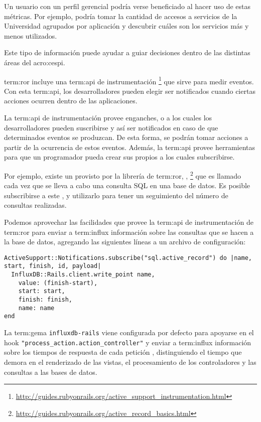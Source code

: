 Un usuario con un perfil gerencial podría verse beneficiado al hacer uso de
estas métricas. Por ejemplo, podría tomar la cantidad de accesos a servicios de
la Universidad agrupados por aplicación y descubrir cuáles son los servicios
más y menos utilizados.

Este tipo de información puede ayudar a guiar decisiones dentro de las
distintas áreas del \gls{acro:cespi}.

\gls{term:ror} incluye una \gls{term:api} de instrumentación
\footnote{\url{http://guides.rubyonrails.org/active_support_instrumentation.html}}
que sirve para medir eventos. Con esta \gls{term:api}, los desarrolladores
pueden elegir ser notificados cuando ciertas acciones ocurren dentro de las
aplicaciones.

La \gls{term:api} de instrumentación provee enganches, o  a los
cuales los desarrolladores pueden suscribirse y así ser notificados en caso de
que determinados eventos se produzcan. De esta forma, se podrán tomar acciones
a partir de la ocurrencia de estos eventos. Además, la \gls{term:api} provee
herramientas para que un programador pueda crear sus propios  a los
cuales subscribirse.

Por ejemplo, existe un  provisto por la librería de \gls{term:ror},
,
\footnote{\url{http://guides.rubyonrails.org/active_record_basics.html}} que es
llamado cada vez que se lleva a cabo una consulta SQL en una base de datos. Es
posible subscribirse a este , y utilizarlo para tener un seguimiento
del número de consultas realizadas.

Podemos aprovechar las facilidades que provee la \gls{term:api} de
instrumentación de \gls{term:ror} para enviar a \gls{term:influx} información
sobre las consultas que se hacen a la base de datos, agregando las siguientes
líneas a un archivo de configuración:

\begin{lstlisting}
ActiveSupport::Notifications.subscribe("sql.active_record") do |name, start, finish, id, payload|
  InfluxDB::Rails.client.write_point name,
    value: (finish-start),
    start: start,
    finish: finish,
    name: name
end
\end{lstlisting}

La \gls{term:gema} \texttt{influxdb-rails} viene configurada por defecto para
apoyarse en el hook \lstinline{"process_action.action_controller"} y enviar a
\gls{term:influx} información sobre los tiempos de respuesta de cada petición
, distinguiendo el tiempo que demora en el renderizado de las vistas,
el procesamiento de los controladores y las consultas a las bases de datos.


